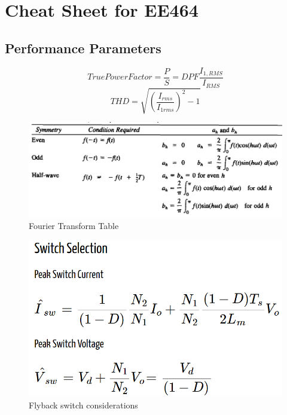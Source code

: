 \documentclass[twocolumn, ]{article}
\begin{document}
\section*{\small Cheat Sheet for EE464}

\subsection*{\small Performance Parameters}
\begin{equation*}
True Power Factor=\frac{P}{S}=DPF \frac{I_{1,RMS}}{I_{RMS}}
\end{equation*}
\begin{equation*}
THD=\sqrt{(\frac{I_{rms}}{I_{1rms}})^2-1}
\end{equation*}



  \begin{figure}[!ht]
	\includegraphics[scale=0.30]{Fourier.png}
	\caption{Fourier Transform Table}
\end{figure}


  \begin{figure}[!ht]
	\includegraphics[scale=0.30]{flybak_switch}
	\caption{Flyback switch considerations}
\end{figure}
\end{document}
